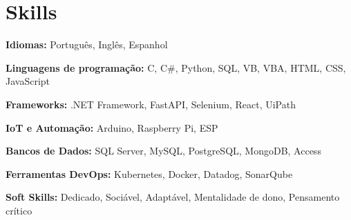 \section{Skills}
	\begin{SkillHighlights} %
		\item \textbf{Idiomas:} Português, Inglês, Espanhol
		\item \textbf{Linguagens de programação:} C, C\#, Python, SQL, VB, VBA, HTML, CSS, JavaScript
		\item \textbf{Frameworks:} .NET Framework, FastAPI, Selenium, React, UiPath
		\item \textbf{IoT e Automação:} Arduino, Raspberry Pi, ESP
		
		\switchcolumn %

		\item \textbf{Bancos de Dados:} SQL Server, MySQL, PostgreSQL, MongoDB, Access
		\item \textbf{Ferramentas DevOps:} Kubernetes, Docker, Datadog, SonarQube
		\item \textbf{Soft Skills:} Dedicado, Sociável, Adaptável, Mentalidade de dono, Pensamento crítico
	\end{SkillHighlights}	
